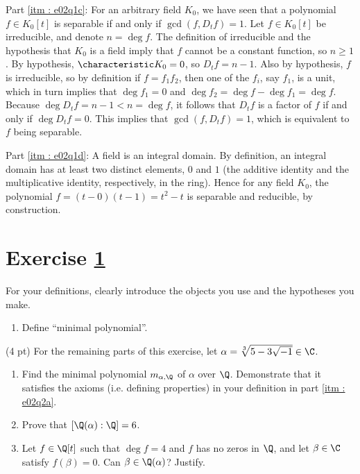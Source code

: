 {Part \ref{itm : e02q1c}: For an arbitrary field $K_{0}$, we have seen that a polynomial $f \in K_{0}[t]$ is separable if and only if $\gcd(f, D_{t} f) = 1$. Let $f \in K_{0}[t]$ be irreducible, and denote $n = \deg f$. The definition of irreducible and the hypothesis that $K_{0}$ is a field imply that $f$ cannot be a constant function, so $n \geq 1$. By hypothesis, $\characteristic K_{0} = 0$, so $D_{t} f = n - 1$. Also by hypothesis, $f$ is irreducible, so by definition if $f = f_{1} f_{2}$, then one of the $f_{i}$, say $f_{1}$, is a unit, which in turn implies that $\deg f_{1} = 0$ and $\deg f_{2} = \deg f - \deg f_{1} = \deg f$. Because $\deg D_{t} f = n - 1 < n = \deg f$, it follows that $D_{t} f$ is a factor of $f$ if and only if $\deg D_{t} f = 0$. This implies that $\gcd(f, D_{t} f) = 1$, which is equivalent to $f$ being separable.

Part \ref{itm : e02q1d}: A field is an integral domain. By definition, an integral domain has at least two distinct elements, $0$ and $1$ (the additive identity and the multiplicative identity, respectively, in the ring). Hence for any field $K_{0}$, the polynomial $f = (t - 0) (t - 1) = t^{2} - t$ is separable and reducible, by construction.}%



\section{Exercise \ref{sec : e02q2}}
\label{sec : e02q2}

\noindent{}For your definitions, clearly introduce the objects you use and the hypotheses you make.
\begin{enumerate}[label=(\alph*)]
\item\label{itm : e02q2a} Define ``minimal polynomial''.
\end{enumerate}
(4 pt) For the remaining parts of this exercise, let $\alpha = \sqrt[3]{5 - 3 \sqrt{-1}} \in \C$.
\begin{enumerate}[resume, label=(\alph*)]
\item\label{itm : e02q2b} Find the minimal polynomial $m_{\alpha, \Q}$ of $\alpha$ over $\Q$. Demonstrate that it satisfies the axioms (i.e. defining properties) in your definition in part \ref{itm : e02q2a}.
\item\label{itm : e02q2c} Prove that $[\Q(\alpha) : \Q] = 6$.
\item\label{itm : e02q2d} Let $f \in \Q[t]$ such that $\deg f = 4$ and $f$ has no zeros in $\Q$, and let $\beta \in \C$ satisfy $f(\beta) = 0$. Can $\beta \in \Q(\alpha)$? Justify.
\end{enumerate}

